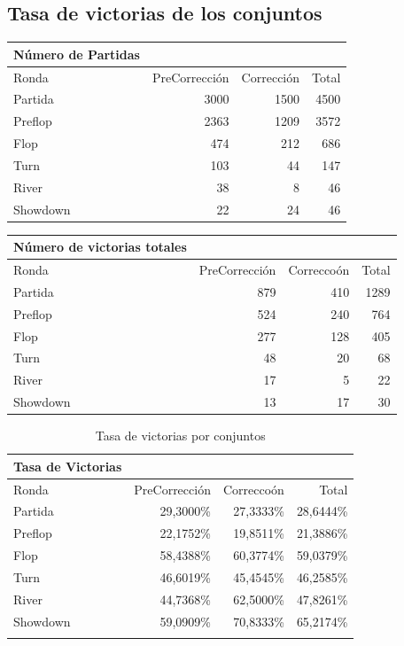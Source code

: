 \newpage

\subsection{Tasa de victorias de los conjuntos}

\begin{longtable}[c]{lrrr}
\hline
Número de Partidas &  &  &  \\ \hline
Ronda & PreCorrección & Corrección & Total \\ \hline
Partida & 3000 & 1500 & 4500 \\ 
Preflop & 2363 & 1209 & 3572 \\ 
Flop & 474 & 212 & 686 \\ 
Turn & 103 & 44 & 147 \\ 
River & 38 & 8 & 46 \\ 
Showdown & 22 & 24 & 46 \\ \hline
\end{longtable}

\begin{longtable}[c]{lrrr}
\hline
Número de victorias totales &  &  &  \\ \hline
Ronda & PreCorrección & Correccoón & Total \\ \hline
Partida & 879 & 410 & 1289 \\ 
Preflop & 524 & 240 & 764 \\ 
Flop & 277 & 128 & 405 \\ 
Turn & 48 & 20 & 68 \\ 
River & 17 & 5 & 22 \\ 
Showdown & 13 & 17 & 30 \\ \hline
\end{longtable}

\begin{longtable}[c]{lrrr}
\hline
Tasa de Victorias &  &  &  \\ \hline
Ronda & PreCorrección & Correccoón & Total \\ \hline
Partida & 29,3000\% & 27,3333\% & 28,6444\% \\ 
Preflop & 22,1752\% & 19,8511\% & 21,3886\% \\ 
Flop & 58,4388\% & 60,3774\% & 59,0379\% \\ 
Turn & 46,6019\% & 45,4545\% & 46,2585\% \\ 
River & 44,7368\% & 62,5000\% & 47,8261\% \\ 
Showdown & 59,0909\% & 70,8333\% & 65,2174\% \\ \hline
\caption{Tasa de victorias por conjuntos}
\label{tab:winrateT}
\end{longtable}

